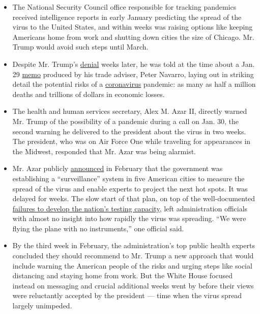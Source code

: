 \begin{itemize}
\item
  The National Security Council office responsible for tracking
  pandemics received intelligence reports in early January predicting
  the spread of the virus to the United States, and within weeks was
  raising options like keeping Americans home from work and shutting
  down cities the size of Chicago. Mr. Trump would avoid such steps
  until March.
\item
  Despite Mr. Trump's
  \href{https://www.whitehouse.gov/briefings-statements/remarks-president-trump-vice-president-pence-members-coronavirus-task-force-press-briefing-april-7-2020/}{denial}
  weeks later, he was told at the time about a Jan. 29
  \href{https://www.nytimes.com/2020/04/06/us/politics/navarro-warning-trump-coronavirus.html}{memo}
  produced by his trade adviser, Peter Navarro, laying out in striking
  detail the potential risks of a
  \href{https://www.nytimes.com/2020/04/14/us/politics/trump-authority.html}{coronavirus}
  pandemic: as many as half a million deaths and trillions of dollars in
  economic losses.
\item
  The health and human services secretary, Alex M. Azar II, directly
  warned Mr. Trump of the possibility of a pandemic during a call on
  Jan. 30, the second warning he delivered to the president about the
  virus in two weeks. The president, who was on Air Force One while
  traveling for appearances in the Midwest, responded that Mr. Azar was
  being alarmist.
\item
  Mr. Azar publicly
  \href{https://www.cidrap.umn.edu/news-perspective/2020/02/cdc-flu-surveillance-system-enlisted-hunt-covid-19-cases}{announced}
  in February that the government was establishing a ``surveillance''
  system in five American cities to measure the spread of the virus and
  enable experts to project the next hot spots. It was delayed for
  weeks. The slow start of that plan, on top of the well-documented
  \href{https://www.nytimes.com/2020/03/28/us/testing-coronavirus-pandemic.html}{failures
  to develop the nation's testing capacity}, left administration
  officials with almost no insight into how rapidly the virus was
  spreading. ``We were flying the plane with no instruments,'' one
  official said.
\item
  By the third week in February, the administration's top public health
  experts concluded they should recommend to Mr. Trump a new approach
  that would include warning the American people of the risks and urging
  steps like social distancing and staying home from work. But the White
  House focused instead on messaging and crucial additional weeks went
  by before their views were reluctantly accepted by the president ---
  time when the virus spread largely unimpeded.
\end{itemize}

